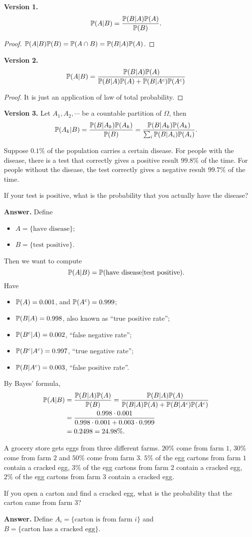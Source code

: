 \textbf{Version 1.}
\[
  \mathbb{P}(A|B) = \frac{\mathbb{P}(B|A)\mathbb{P}(A)}{\mathbb{P}(B)}.
\]
\begin{proof}
  $\mathbb{P}(A|B) \mathbb{P}(B) = \mathbb{P}(A\cap B) = \mathbb{P}(B|A) \mathbb{P}(A)$.
\end{proof}
\textbf{Version 2.}
\[
  \mathbb{P}(A|B) = \frac{\mathbb{P}(B|A) \mathbb{P}(A)}{\mathbb{P}(B|A)\mathbb{P}(A) + \mathbb{P}(B|A^c) \mathbb{P}(A^c)}
\]
\begin{proof}
  It is just an application of law of total probability. 
\end{proof}
\textbf{Version 3.} Let $A_1,A_2,\cdots$ be a countable partition of $\Omega$,
then
\[
  \mathbb{P}(A_k|B) = \frac{\mathbb{P}(B|A_k)\mathbb{P}(A_k)}{\mathbb{P}(B)} = \frac{\mathbb{P}(B|A_k)\mathbb{P}(A_k)}{\sum_i\mathbb{P}(B|A_i)\mathbb{P}(A_i)}.
\]
\begin{example}
  Suppose $0.1\%$ of the population carries a certain disease. For people with
  the disease, there is a test that correctly gives a positive result $99.8\%$
  of the time. For people without the disease, the test correctly gives a
  negative result $99.7\%$ of the time.

  If your test is positive, what is the probability that you actually have the disease?
\end{example}
\textbf{Answer.} Define
\begin{itemize}
\item $A = \{\text{have disease}\}$;
\item $B = \{\text{test positive}\}$.
\end{itemize}
Then we want to compute
\[
  \mathbb{P}(A|B) = \mathbb{P}(\text{have disease}|\text{test positive}).
\]
Have
\begin{itemize}
\item $\mathbb{P}(A) = 0.001$, and $\mathbb{P}(A^c) = 0.999$;
\item $\mathbb{P}(B|A) = 0.998$, also known as ``true positive rate'';
\item $\mathbb{P}(B^c|A) = 0.002$, ``false negative rate'';
\item $\mathbb{P}(B^c|A^c) = 0.997$, ``true negative rate'';
\item $\mathbb{P}(B|A^c) = 0.003$, ``false positive rate''.
\end{itemize}
By Bayes' formula,
\begin{align*}
  \mathbb{P}(A|B) & = \frac{\mathbb{P}(B|A)\mathbb{P}(A)}{\mathbb{P}(B)} = \frac{\mathbb{P}(B|A)\mathbb{P}(A)}{\mathbb{P}(B|A)\mathbb{P}(A) + \mathbb{P}(B|A^c) \mathbb{P}(A^c)}\\
           & = \frac{0.998\cdot 0.001}{0.998\cdot 0.001 + 0.003 \cdot 0.999}\\
  & = 0.2498 = 24.98\%.
\end{align*}
\begin{example}
  A grocery store gets eggs from three different farms. $20\%$ come from farm
  $1$, $30\%$ come from farm $2$ and $50\%$ come from farm $3$. $5\%$ of the egg
  cartons from farm $1$ contain a cracked egg, $3\%$ of the egg
  cartons from farm $2$ contain a cracked egg, $2\%$ of the egg
  cartons from farm $3$ contain a cracked egg.

  If you open a carton and find a cracked egg, what is the probability that the
  carton came from farm $3$?
\end{example}
\textbf{Answer.} Define $A_i = \{\text{carton is from farm $i$}\}$ and $B =
\{\text{carton has a cracked egg}\}$.

